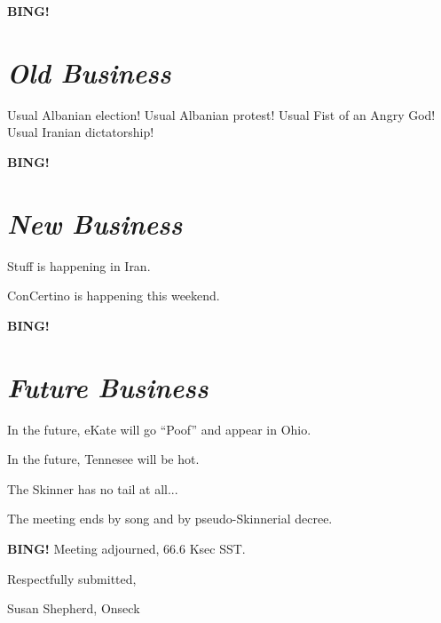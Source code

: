 \documentclass[10pt]{article}
\newcommand{\bing}{{\bf BING!} }
\newcommand{\goto}[1]{\bing \vskip 12pt \section*{{\em{#1}}}}
\begin{document}
\goto{Old Business}

Usual Albanian election! Usual Albanian protest! Usual Fist of an Angry God! Usual Iranian dictatorship!

\goto{New Business}

Stuff is happening in Iran.

ConCertino is happening this weekend.

\goto{Future Business}

In the future, eKate will go ``Poof'' and appear in Ohio.

In the future, Tennesee will be hot.

The Skinner has no tail at all...

The meeting ends by song and by pseudo-Skinnerial decree.

\bing
\noindent
Meeting adjourned, 66.6 Ksec SST.

\vspace{18pt}

\centerline{Respectfully submitted,}
\centerline{Susan Shepherd, Onseck}
\end{document}

